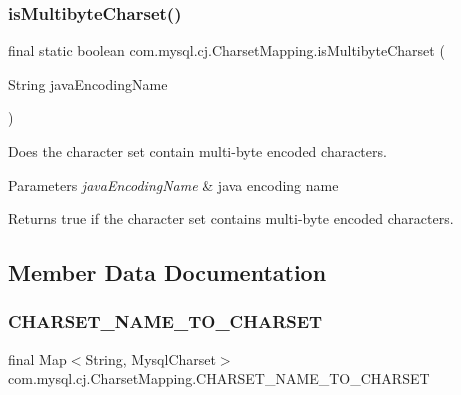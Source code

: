 \subsubsection{\texorpdfstring{is\+Multibyte\+Charset()}{isMultibyteCharset()}}
{\footnotesize\ttfamily final static boolean com.\+mysql.\+cj.\+Charset\+Mapping.\+is\+Multibyte\+Charset (\begin{DoxyParamCaption}\item[{String}]{java\+Encoding\+Name }\end{DoxyParamCaption})\hspace{0.3cm}{\ttfamily [static]}}

Does the character set contain multi-\/byte encoded characters.


\begin{DoxyParams}{Parameters}
{\em java\+Encoding\+Name} & java encoding name \\
\hline
\end{DoxyParams}
\begin{DoxyReturn}{Returns}
true if the character set contains multi-\/byte encoded characters. 
\end{DoxyReturn}


\subsection{Member Data Documentation}
\mbox{\label{classcom_1_1mysql_1_1cj_1_1_charset_mapping_a4e8f3b6a18adf7f56d95cd1678793808}} 
\subsubsection{\texorpdfstring{C\+H\+A\+R\+S\+E\+T\+\_\+\+N\+A\+M\+E\+\_\+\+T\+O\+\_\+\+C\+H\+A\+R\+S\+ET}{CHARSET\_NAME\_TO\_CHARSET}}
{\footnotesize\ttfamily final Map$<$String, Mysql\+Charset$>$ com.\+mysql.\+cj.\+Charset\+Mapping.\+C\+H\+A\+R\+S\+E\+T\+\_\+\+N\+A\+M\+E\+\_\+\+T\+O\+\_\+\+C\+H\+A\+R\+S\+ET\hspace{0.3cm}{\ttfamily [static]}}

